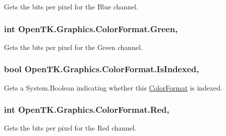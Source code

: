 Gets the bits per pixel for the Blue channel.

\hypertarget{struct_open_t_k_1_1_graphics_1_1_color_format_a0f17008f6787a52dd9de950bb23919e1}{
\subsubsection[{Green}]{\setlength{\rightskip}{0pt plus 5cm}int Open\-T\-K.\-Graphics.\-Color\-Format.\-Green\hspace{0.3cm}{\ttfamily [get]}, {\ttfamily [set]}}}\label{struct_open_t_k_1_1_graphics_1_1_color_format_a0f17008f6787a52dd9de950bb23919e1}


Gets the bits per pixel for the Green channel.

\hypertarget{struct_open_t_k_1_1_graphics_1_1_color_format_ad637b57bedf797f4996b698adb0e5383}{
\subsubsection[{Is\-Indexed}]{\setlength{\rightskip}{0pt plus 5cm}bool Open\-T\-K.\-Graphics.\-Color\-Format.\-Is\-Indexed\hspace{0.3cm}{\ttfamily [get]}, {\ttfamily [set]}}}\label{struct_open_t_k_1_1_graphics_1_1_color_format_ad637b57bedf797f4996b698adb0e5383}


Gets a System.\-Boolean indicating whether this \hyperlink{struct_open_t_k_1_1_graphics_1_1_color_format}{Color\-Format} is indexed.

\hypertarget{struct_open_t_k_1_1_graphics_1_1_color_format_a22906f49d73faf746e644ff2adfd06ae}{
\subsubsection[{Red}]{\setlength{\rightskip}{0pt plus 5cm}int Open\-T\-K.\-Graphics.\-Color\-Format.\-Red\hspace{0.3cm}{\ttfamily [get]}, {\ttfamily [set]}}}\label{struct_open_t_k_1_1_graphics_1_1_color_format_a22906f49d73faf746e644ff2adfd06ae}


Gets the bits per pixel for the Red channel.

